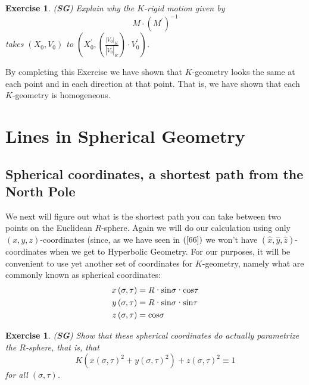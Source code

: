 \documentclass{article}%
\newtheorem{exercise}[theorem]{Exercise}
\begin{document}
\begin{exercise}
\label{64}(\textbf{SG}) Explain why the $K$-rigid motion given by%
\[
M\cdot\left(  M^{\prime}\right)  ^{-1}%
\]
takes $\left(  X_{0},V_{0}\right)  $ to $\left(  X_{0}^{\prime},\left(
\frac{\left\vert V_{0}\right\vert _{K}}{\left\vert V_{0}^{\prime}\right\vert
_{K}}\right)  \cdot V_{0}^{\prime}\right)  $.
\end{exercise}

By completing this Exercise we have shown that $K$-geometry looks the same at
each point and in each direction at that point. That is, we have shown that
each $K$-geometry is homogeneous.\pagebreak

\section{Lines in Spherical Geometry}

\subsection{Spherical coordinates, a shortest path from the North Pole}

We next will figure out what is the shortest path you can take between two
points on the Euclidean $R$-sphere. Again we will do our calculation using
only $\left(  x,y,z\right)  $-coordinates (since, as we have seen in $\left(
\ref{66}\right)  $ we won't have $\left(  \hat{x},\hat{y},\hat{z}\right)
$-coordinates when we get to Hyperbolic Geometry. For our purposes, it will be
convenient to use yet another set of coordinates for $K$-geometry, namely what
are commonly known as spherical coordinates:%
\begin{align}
x\left(  \sigma,\tau\right)   &  =R\text{\textperiodcentered}\mathrm{sin}%
\sigma\text{\textperiodcentered}\mathrm{cos}\tau\nonumber\\
y\left(  \sigma,\tau\right)   &  =R\text{\textperiodcentered}\mathrm{sin}%
\sigma\text{\textperiodcentered}\mathrm{sin}\tau\label{133}\\
z\left(  \sigma,\tau\right)   &  =\mathrm{cos}\sigma\nonumber
\end{align}


\begin{exercise}
(\textbf{SG}) Show that these spherical coordinates do actually parametrize
the $R$-sphere, that is, that%
\[
K\left(  x\left(  \sigma,\tau\right)  ^{2}+y\left(  \sigma,\tau\right)
^{2}\right)  +z\left(  \sigma,\tau\right)  ^{2}\equiv1
\]
for all $\left(  \sigma,\tau\right)  $.
\end{exercise}
\end{document}

